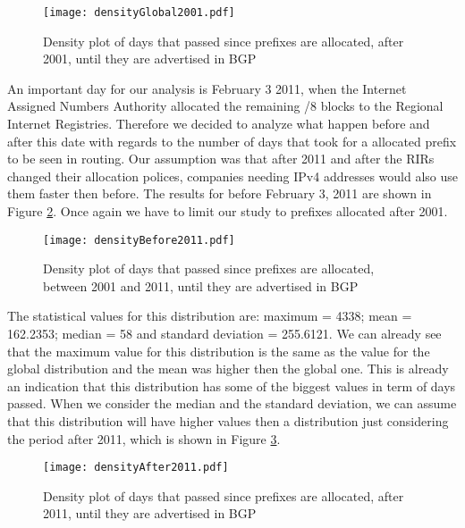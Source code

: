 \documentclass[11pt,a4paper]{scrreprt}
\begin{document}
\begin{figure}[!h]
\centering
\texttt{[image: densityGlobal2001.pdf]}
\caption{Density plot of days that passed since prefixes are allocated, after 2001, until they are advertised in BGP}
\label{fig:densityGlobal2001}
\end{figure}

An important day for our analysis is February 3 2011, when the Internet Assigned Numbers Authority allocated the remaining /8 blocks to the Regional Internet Registries. Therefore we decided to analyze what happen before and after this date with regards to the number of days that took for a allocated prefix to be seen in routing. Our assumption was that after 2011 and after the RIRs changed their allocation polices, companies needing IPv4 addresses would also use them faster then before. 
The results for before February 3, 2011 are shown in Figure \ref{fig:densityBefore2001}. Once again we have to limit our study to prefixes allocated after 2001.  


\begin{figure}[!h]
\centering
\texttt{[image: densityBefore2011.pdf]}
\caption{Density plot of days that passed since prefixes are allocated, between 2001 and 2011, until they are advertised in BGP}
\label{fig:densityBefore2001}
\end{figure}

The statistical values for this distribution are: maximum = 4338; mean = 162.2353; median = 58 and standard deviation = 255.6121. We can already see that the maximum value for this distribution is the same as the value for the global distribution and the mean was higher then the global one. This is already an indication that this distribution has some of the biggest values in term of days passed. When we consider the median and the standard deviation, we can assume that this distribution will have higher values then a distribution just considering the period after 2011, which is shown in Figure \ref{fig:densityAfter2001}.


\begin{figure}[!h]
\centering
\texttt{[image: densityAfter2011.pdf]}
\caption{Density plot of days that passed since prefixes are allocated, after 2011, until they are advertised in BGP}
\label{fig:densityAfter2001}
\end{figure}
\end{document}
